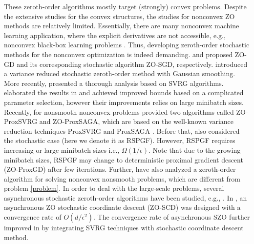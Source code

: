 \documentclass{article}
\theoremstyle{definition}
\theoremstyle{remark}
\begin{document}
These zeroth-order algorithms mostly target (strongly) convex problems. Despite the extensive studies for the convex structures, the studies for nonconvex ZO methods are relatively limited.  Essentially, there are many nonconvex machine learning application, where the explicit derivatives are not accessible, e.g., nonconvex black-box learning problems \cite{chen2017zoo,liu2018zeroth}. Thus, developing zeroth-order stochastic methods for the nonconvex optimization is indeed demanding.
\cite{ghadimi2013stochastic} and \cite{nesterov2011random} proposed ZO-GD and
its corresponding stochastic algorithm ZO-SGD, respectively. \cite{liu2018stochastic} introduced a variance reduced stochastic zeroth-order method with  Gaussian smoothing. More recently, \cite{liu2018zeroth} presented a thorough analysis based on SVRG algorithms. \cite{ji2019improved} elaborated the results in \cite{liu2018zeroth} and achieved improved bounds based on a complicated parameter selection, however their improvements relies on large minibatch sizes. 
Recently, for nonsmooth nonconvex problems \cite{huang2019faster} provided two algorithms called ZO-ProxSVRG and ZO-ProxSAGA, which are based on the well-known variance reduction techniques ProxSVRG and ProxSAGA \cite{reddi2016proximal}. Before that,  \cite{ghadimi2016accelerated} also considered the stochastic case (here we denote
it as RSPGF). However, RSPGF requires increasing or large minibatch sizes i.e., $\Omega(1/\epsilon)$. Note that due to the
growing minibatch sizes, RSPGF may change to deterministic proximal gradient descent (ZO-ProxGD) after few iterations. Further, \cite{liu2018stochastic} have also analyzed a zeroth-order algorithm for solving nonconvex nonsmooth problems, which are different from problem \eqref{problem}.
In order to deal with the large-scale problems, several asynchronous stochastic zeroth-order algorithms have been studied, e.g., \cite{gu2018inexact,lian2016comprehensive,gu2018faster}.
In \cite{lian2016comprehensive}, an asynchronous ZO stochastic coordinate
descent (ZO-SCD) was designed with a convergence rate of $O(d/\epsilon^2)$.
The convergence rate of asynchronous SZO further improved in \cite{gu2018faster} 
 by integrating SVRG techniques with stochastic coordinate descent method.
  
\end{document}
